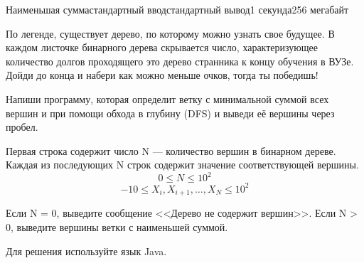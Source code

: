\begin{problem}{Наименьшая сумма}{стандартный ввод}{стандартный вывод}{1 секунда}{256 мегабайт}

По легенде, существует дерево, по которому можно узнать свое будущее. В каждом листочке бинарного дерева скрывается число, характеризующее количество долгов проходящего это дерево странника к концу обучения в ВУЗе. Дойди до конца и набери как можно меньше очков, тогда ты победишь! 

Напиши программу, которая определит ветку с минимальной суммой всех вершин и при помощи обхода в глубину (DFS) и выведи её вершины через пробел.

\InputFile
Первая строка содержит число N --- количество вершин в бинарном дереве. Каждая из последующих N строк содержит значение соответствующей вершины.
\vspace{1em}
$$0\le N\le 10^2$$
$$-10\le X_i, X_{i+1}, \ldots, X_N\le 10^2$$

\OutputFile
Если N = 0, выведите сообщение <<Дерево не содержит вершин>>.
Если N > 0, выведите вершины ветки с наименьшей суммой.

\Examples

\begin{example}
%
%
%
\end{example}

\Note
Для решения используйте язык Java.

\end{problem}


